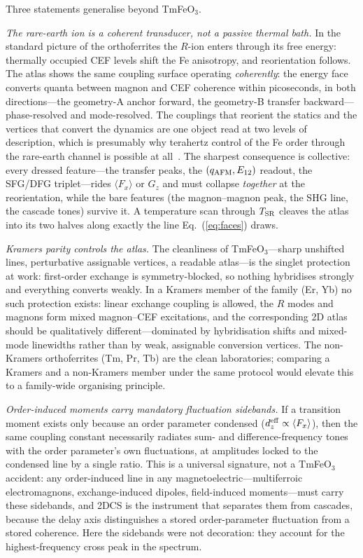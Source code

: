 \documentclass[aps,prb,twocolumn,superscriptaddress,longbibliography]{revtex4-2}
\newcommand{\qafm}{q_{\rm AFM}}
\begin{document}
Three statements generalise beyond TmFeO$_3$.

\emph{The rare-earth ion is a coherent transducer, not a passive
thermal bath.}  In the standard picture of the orthoferrites the
$R$-ion enters through its free energy: thermally occupied CEF levels
shift the Fe anisotropy, and reorientation follows.  The atlas shows
the same coupling surface operating \emph{coherently}: the energy
face converts quanta between magnon and CEF coherence within
picoseconds, in both directions---the geometry-A anchor forward, the
geometry-B transfer backward---phase-resolved and mode-resolved.  The
couplings that reorient the statics and the vertices that convert the
dynamics are one object read at two levels of description, which is
presumably why terahertz control of the Fe order through the
rare-earth channel is possible at
all~\cite{Baierl2016,Schlauderer2019}.  The sharpest consequence is
collective: every dressed feature---the transfer peaks, the
$(\qafm,E_{12})$ readout, the SFG/DFG triplet---rides
$\langle F_x\rangle$ or $G_z$ and must collapse \emph{together} at
the reorientation, while the bare features (the magnon--magnon peak,
the SHG line, the cascade tones) survive it.  A temperature scan
through $T_{\rm SR}$ cleaves the atlas into its two halves along
exactly the line Eq.~(\ref{eq:faces}) draws.

\emph{Kramers parity controls the atlas.}  The cleanliness of
TmFeO$_3$---sharp unshifted lines, perturbative assignable vertices,
a readable atlas---is the singlet protection at work: first-order
exchange is symmetry-blocked, so nothing hybridises strongly and
everything converts weakly.  In a Kramers member of the family (Er,
Yb) no such protection exists: linear exchange coupling is allowed,
the $R$ modes and magnons form mixed magnon--CEF excitations, and the
corresponding 2D atlas should be qualitatively
different---dominated by hybridisation shifts and mixed-mode
linewidths rather than by weak, assignable conversion vertices.  The
non-Kramers orthoferrites (Tm, Pr, Tb) are the clean laboratories;
comparing a Kramers and a non-Kramers member under the same protocol
would elevate this to a family-wide organising principle.

\emph{Order-induced moments carry mandatory fluctuation sidebands.}
If a transition moment exists only because an order parameter
condensed ($d_z^{\rm eff}\propto\langle F_x\rangle$), then the same
coupling constant necessarily radiates sum- and difference-frequency
tones with the order parameter's own fluctuations, at amplitudes
locked to the condensed line by a single ratio.  This is a universal
signature, not a TmFeO$_3$ accident: any order-induced line in any
magnetoelectric---multiferroic electromagnons, exchange-induced
dipoles, field-induced moments---must carry these sidebands, and 2DCS
is the instrument that separates them from cascades, because the
delay axis distinguishes a stored order-parameter fluctuation from a
stored coherence.  Here the sidebands were not decoration: they
account for the highest-frequency cross peak in the spectrum.
\end{document}
